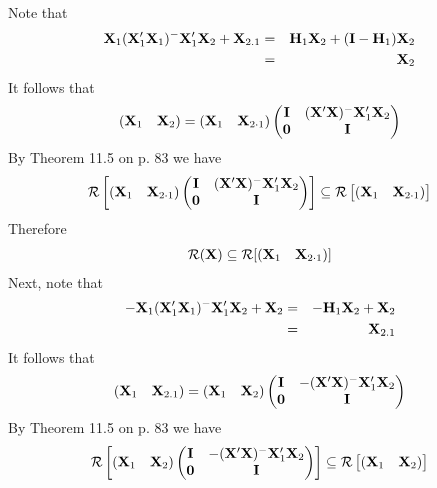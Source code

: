 \bigskip
\noindent
Note that
\begin{eqnarray*}
{\bf X}_1({\bf X}_1'{\bf X}_1)^{-{}}{\bf X}_1'{\bf X}_2+{\bf X}_{2.1}
&=&{\bf H}_1{\bf X}_2+({\bf I}-{\bf H}_1){\bf X}_2\\
&=&{\bf X}_2
\end{eqnarray*}
It follows that
$$(\begin{matrix}{\bf X}_1&{\bf X}_2\end{matrix})
=(\begin{matrix}{\bf X}_1&{\bf X}_{2\cdot1}\end{matrix})
\left(\begin{matrix}
{\bf I} & ({\bf X}'{\bf X})^{-{}}{\bf X}_1'{\bf X}_2\cr
{\bf 0} & {\bf I}
\end{matrix}\right)
$$
By Theorem 11.5 on p. 83 we have
$${\cal R}\left[
(\begin{matrix}{\bf X}_1&{\bf X}_{2\cdot1}\end{matrix})\left(\begin{matrix}
{\bf I} & ({\bf X}'{\bf X})^{-{}}{\bf X}_1'{\bf X}_2\cr
{\bf 0} & {\bf I}
\end{matrix}\right)
\right]
\subseteq
{\cal R}\left[
(\begin{matrix}{\bf X}_1&{\bf X}_{2\cdot1}\end{matrix})
\right]
$$
Therefore
$${\cal R}({\bf X})\subseteq
{\cal R}[(\begin{matrix}{\bf X}_1&{\bf X}_{2\cdot1}\end{matrix})]$$
Next, note that
\begin{eqnarray*}
-{\bf X}_1({\bf X}_1'{\bf X}_1)^{-{}}{\bf X}_1'{\bf X}_2+{\bf X}_2
&=&-{\bf H}_1{\bf X}_2+{\bf X}_2\\
&=&{\bf X}_{2.1}
\end{eqnarray*}
It follows that
$$(\begin{matrix}{\bf X}_1&{\bf X}_{2.1}\end{matrix})
=(\begin{matrix}{\bf X}_1&{\bf X}_2\end{matrix})\left(\begin{matrix}
{\bf I} & -({\bf X}'{\bf X})^{-{}}{\bf X}_1'{\bf X}_2\cr
{\bf 0} & {\bf I}
\end{matrix}\right)
$$
By Theorem 11.5 on p. 83 we have
$$
{\cal R}\left[
(\begin{matrix}{\bf X}_1&{\bf X}_2\end{matrix})\left(\begin{matrix}
{\bf I} & -({\bf X}'{\bf X})^{-{}}{\bf X}_1'{\bf X}_2\cr
{\bf 0} & {\bf I}
\end{matrix}\right)
\right]
\subseteq
{\cal R}\left[
(\begin{matrix}{\bf X}_1&{\bf X}_2\end{matrix})
\right]
$$

